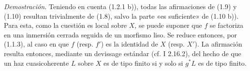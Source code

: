 \emph{Demostración.} Teniendo en cuenta (1.2.1 b)), todas las afirmaciones de (1.9) y (1.10) resultan trivialmente de (1.8), salvo la parte «es suficiente» de (1.10 b)). Para esta, como la cuestión es local sobre \(X\), se puede suponer que \(f\) se factoriza en una inmersión cerrada seguida de un morfismo liso. Se reduce entonces, por (1.1.3), al caso en que \(f\) (resp. \(f'\)) es la identidad de \(X\) (resp. \(X'\)). La afirmación resulta entonces, mediante un devissage estándar (cf. I 2.16.2), del hecho de que un haz cuasicoherente \(L\) sobre \(X\) es de tipo finito si y solo si \(g^*L\) es de tipo finito.
